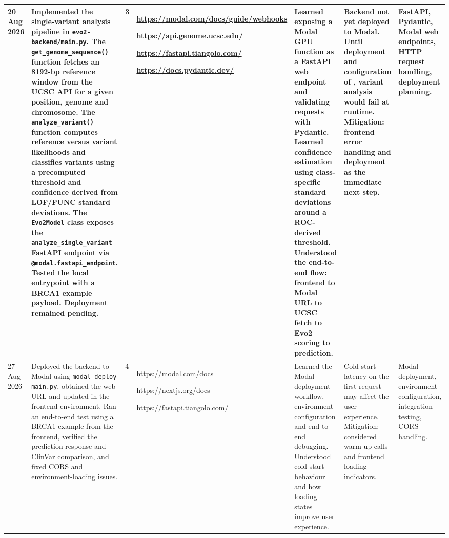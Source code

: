 \documentclass[8pt,a4paper]{article}
\begin{document}
\begin{longtable}{|
    D{1.25cm}|
    D{4.10cm}|
    D{0.70cm}|
    D{2.90cm}|
    D{2.90cm}|
    D{3.00cm}|
    D{2.95cm}|
}
20 Aug 2026 &
Implemented the single-variant analysis pipeline in \texttt{evo2-backend/main.py}. The \texttt{get\_genome\_sequence()} function fetches an 8192-bp reference window from the UCSC API for a given position, genome and chromosome. The \texttt{analyze\_variant()} function computes reference versus variant likelihoods and classifies variants using a precomputed threshold and confidence derived from LOF/FUNC standard deviations. The \texttt{Evo2Model} class exposes the \texttt{analyze\_single\_variant} FastAPI endpoint via \texttt{@modal.fastapi\_endpoint}. Tested the local entrypoint with a BRCA1 example payload. Deployment remained pending. &
3 &
\url{https://modal.com/docs/guide/webhooks}
\par
\url{https://api.genome.ucsc.edu/}
\par
\url{https://fastapi.tiangolo.com/}
\par
\url{https://docs.pydantic.dev/}
&
Learned exposing a Modal GPU function as a FastAPI web endpoint and validating requests with Pydantic. Learned confidence estimation using class-specific standard deviations around a ROC-derived threshold. Understood the end-to-end flow: frontend to Modal URL to UCSC fetch to Evo2 scoring to prediction. &
Backend not yet deployed to Modal. Until deployment and configuration of , variant analysis would fail at runtime. Mitigation: frontend error handling and deployment as the immediate next step. &
FastAPI, Pydantic, Modal web endpoints, HTTP request handling, deployment planning. \\
\hline

27 Aug 2026 &
Deployed the backend to Modal using \texttt{modal deploy main.py}, obtained the web URL and updated  in the frontend environment. Ran an end-to-end test using a BRCA1 example from the frontend, verified the prediction response and ClinVar comparison, and fixed CORS and environment-loading issues. &
4 &
\url{https://modal.com/docs}
\par
\url{https://nextjs.org/docs}
\par
\url{https://fastapi.tiangolo.com/}
&
Learned the Modal deployment workflow, environment configuration and end-to-end debugging. Understood cold-start behaviour and how loading states improve user experience. &
Cold-start latency on the first request may affect the user experience. Mitigation: considered warm-up calls and frontend loading indicators. &
Modal deployment, environment configuration, integration testing, CORS handling. \\
\hline


\end{longtable}
\end{document}
